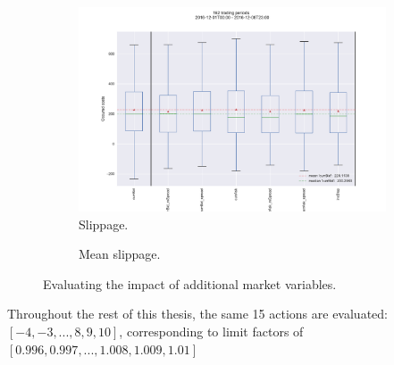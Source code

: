 \begin{figure}[ht]
	\centering
	
	\begin{subfigure}[b]{0.7\textwidth}
        		\centering
        		\includegraphics[width=\textwidth]{content/drawings/performance_limitBase_dec.pdf}
        		\caption{Slippage.}
		\label{fig:actionlimitmapping:plot}
    	\end{subfigure}%
	\begin{subfigure}[b]{0.30\textwidth}
        		\centering
		  \vspace{1.8cm}      		 
        		\caption{Mean slippage.}
		\label{fig:actionlimitmapping:mean}
    	\end{subfigure}

	\caption{Evaluating the impact of additional market variables.}
	\label{fig:actionlimitmapping}
\end{figure}

Throughout the rest of this thesis, the same 15 actions are evaluated: $[-4, -3, ..., 8, 9, 10]$, corresponding to limit factors of $[0.996, 0.997, ..., 1.008, 1.009, 1.01]$\\




